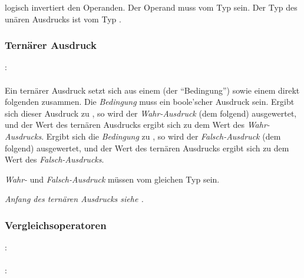 \op{!} logisch invertiert den Operanden. Der Operand muss vom Typ  sein. Der Typ des unären Ausdrucks ist vom Typ .

\subsubsection{Ternärer Ausdruck}\label{Ternaerer Ausdruck}
:\label{asdr_suffix_ternaer}\\
\hspace*{1cm}\Gspace{} \Gspace\Gt{:}\Gspace{} \\

Ein ternärer Ausdruck setzt sich aus einem  (der "`Bedingung"') sowie einem
direkt folgenden  zusammen.
Die \emph{Bedingung} muss ein boole'scher Ausdruck sein. Ergibt sich dieser Ausdruck zu ,
so wird der \emph{Wahr-Ausdruck} (dem  folgend) ausgewertet, und der Wert des ternären
Ausdrucks ergibt sich zu dem Wert des \emph{Wahr-Ausdrucks}.
Ergibt sich die \emph{Bedingung} zu , so wird der \emph{Falsch-Ausdruck} (dem \kw{:} folgend)
ausgewertet, und der Wert des ternären
Ausdrucks ergibt sich zu dem Wert des \emph{Falsch-Ausdrucks}.

\emph{Wahr-} und \emph{Falsch-Ausdruck} müssen vom gleichen Typ sein.

\emph{Anfang des ternären Ausdrucks siehe .}


\subsubsection{Vergleichsoperatoren}\label{Vergleichsoperatoren}
:\label{asdr_gleichheit}\\
\hspace*{1cm} \Gspace{}\\
:\label{asdr_vergleich}\\
\hspace*{1cm} \Gspace{}\\

